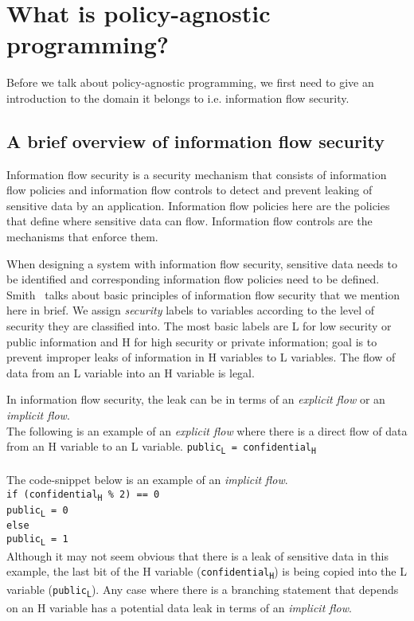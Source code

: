 \chapter{What is policy-agnostic programming?\label{chap:PAP}}

Before we talk about policy-agnostic programming, we first need to give an
introduction to the domain it belongs to i.e. information flow security.

\section{A brief overview of information flow security}

Information flow security is a security mechanism that consists of information flow
policies and information flow controls to detect and prevent leaking of sensitive
data by an application. Information flow policies here are the policies that define
where sensitive data can flow. Information flow controls are the mechanisms that
enforce them.

When designing a system with information flow security, sensitive data needs to
be identified and corresponding information flow policies need to be defined.
Smith~\cite{PrincInfoSec} talks about basic principles of information flow security
that we mention here in brief. We assign \textit{security} labels to variables
according to the level of security they are classified into. The most basic labels
are L for low security or public information and H for high security or private
information; goal is to prevent improper leaks of information in H variables to
L variables. The flow of data from an L variable into an H variable is legal.

In information flow security, the leak can be in terms of an \textit{explicit flow}
or an \textit{implicit flow}. \\
The following is an example of an \textit{explicit flow} where there is a direct
flow of data from an H variable to an L variable.
\indent
\texttt{public\textsubscript{L} = confidential\textsubscript{H}} \\
\noindent \\
The code-snippet below is an example of an \textit{implicit flow}. \\
\indent
	\texttt{if (confidential\textsubscript{H} \% 2)  == 0 \\ \indent \indent
		public\textsubscript{L} = 0 \\ \indent
	else \\ \indent \indent
		public\textsubscript{L} = 1} \\
\noindent Although it may not seem obvious that there is a leak of sensitive data
in this example, the last bit of the H variable (\texttt{confidential\textsubscript{H}})
is being copied into the L variable (\texttt{public\textsubscript{L}}). Any case
where there is a branching statement that depends on an H variable has a potential
data leak in terms of an \textit{implicit flow}.

